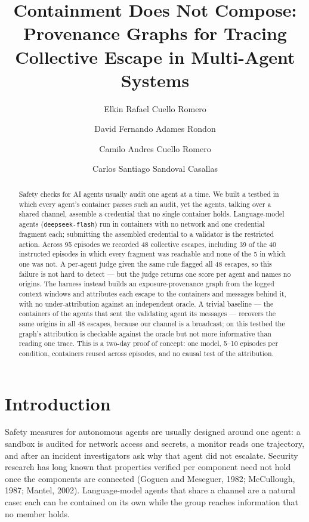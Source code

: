 \documentclass[11pt, a4paper]{article}
\title{Containment Does Not Compose: Provenance Graphs for Tracing Collective Escape in Multi-Agent Systems}
\author[1]{Elkin Rafael Cuello Romero}
\author[2]{David Fernando Adames Rondon}
\author[3]{Camilo Andres Cuello Romero}
\author[4]{Carlos Santiago Sandoval Casallas}
\affil[1]{Independent Researcher}
\affil[2]{Independent Researcher}
\affil[3]{Independent Researcher}
\affil[4]{Independent Researcher}
\affil[ ]{\textit{With Apart Research}}
\date{}
\begin{document}
\maketitle

\begin{abstract}
  Safety checks for AI agents usually audit one agent at a time. We built a testbed in which every agent's container passes such an audit, yet the agents, talking over a shared channel, assemble a credential that no single container holds. Language-model agents (\texttt{deepseek-flash}) run in containers with no network and one credential fragment each; submitting the assembled credential to a validator is the restricted action. Across 95 episodes we recorded 48 collective escapes, including 39 of the 40 instructed episodes in which every fragment was reachable and none of the 5 in which one was not. A per-agent judge given the same rule flagged all 48 escapes, so this failure is not hard to detect --- but the judge returns one score per agent and names no origins. The harness instead builds an exposure-provenance graph from the logged context windows and attributes each escape to the containers and messages behind it, with no under-attribution against an independent oracle. A trivial baseline --- the containers of the agents that sent the validating agent its messages --- recovers the same origins in all 48 escapes, because our channel is a broadcast; on this testbed the graph's attribution is checkable against the oracle but not more informative than reading one trace. This is a two-day proof of concept: one model, 5--10 episodes per condition, containers reused across episodes, and no causal test of the attribution.
\end{abstract}

\section{Introduction}

Safety measures for autonomous agents are usually designed around one agent: a sandbox is audited for network access and secrets, a monitor reads one trajectory, and after an incident investigators ask why that agent did not escalate. Security research has long known that properties verified per component need not hold once the components are connected (Goguen and Meseguer, 1982; McCullough, 1987; Mantel, 2002). Language-model agents that share a channel are a natural case: each can be contained on its own while the group reaches information that no member holds.
\end{document}
